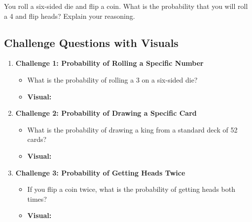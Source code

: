You roll a six-sided die and flip a coin. What is the probability that you will roll a 4 and flip heads? Explain your reasoning.
\subsection{Challenge Questions with Visuals}

\begin{enumerate}
    \item \textbf{Challenge 1: Probability of Rolling a Specific Number}
    \begin{itemize}
        \item What is the probability of rolling a 3 on a six-sided die?
        \item \textbf{Visual:}
        \begin{center}
        \end{center}
    \end{itemize}

    \item \textbf{Challenge 2: Probability of Drawing a Specific Card}
    \begin{itemize}
        \item What is the probability of drawing a king from a standard deck of 52 cards?
        \item \textbf{Visual:}
        \begin{center}
        \end{center}
    \end{itemize}

    \item \textbf{Challenge 3: Probability of Getting Heads Twice}
    \begin{itemize}
        \item If you flip a coin twice, what is the probability of getting heads both times?
        \item \textbf{Visual:}
        \begin{center}
        \end{center}
    \end{itemize}


\end{enumerate}
